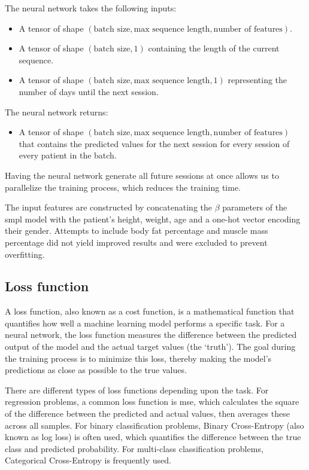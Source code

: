 The neural network takes the following inputs:

\begin{itemize}
    \item A tensor of shape $(\text{batch size}, \text{max sequence length}, \text{number
                  of features})$.
    \item A tensor of shape $(\text{batch size}, 1)$ containing the length of the current
          sequence.
    \item A tensor of shape $(\text{batch size}, \text{max sequence length}, 1)$
          representing the number of days until the next session.
\end{itemize}

The neural network returns:

\begin{itemize}
    \item A tensor of shape $(\text{batch size}, \text{max sequence length}, \text{number
                  of features})$ that contains the predicted values for the next session for
          every session of every patient in the batch.
\end{itemize}

Having the neural network generate all future sessions at once allows us to
parallelize the training process, which reduces the training time.

The input features are constructed by concatenating the $\beta$ parameters of
the \gls{smpl} model with the patient's height, weight, age and a one-hot
vector encoding their gender. Attempts to include body fat percentage and
muscle mass percentage did not yield improved results and were excluded to
prevent overfitting.

\subsection{Loss function}

A loss function, also known as a cost function, is a mathematical function that
quantifies how well a machine learning model performs a specific task. For a
neural network, the loss function measures the difference between the predicted
output of the model and the actual target values (the `truth'). The goal during
the training process is to minimize this loss, thereby making the model's
predictions as close as possible to the true values.

There are different types of loss functions depending upon the task. For
regression problems, a common loss function is \gls{mse}, which calculates the
square of the difference between the predicted and actual values, then averages
these across all samples. For binary classification problems, Binary
Cross-Entropy (also known as log loss) is often used, which quantifies the
difference between the true class and predicted probability. For multi-class
classification problems, Categorical Cross-Entropy is frequently used.

